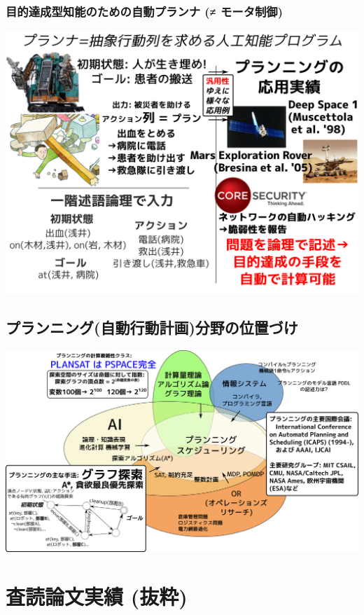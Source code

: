 \subsubsection{目的達成型知能のための自動プランナ (≠ モータ制御)}
\label{sec:orgheadline16}

\includegraphics{img/planning/final.png}

\subsection{プランニング(自動行動計画)分野の位置づけ}
\label{sec:orgheadline18}

\includegraphics{img/planning2.png}

\section{査読論文実績 (抜粋)}
\label{sec:orgheadline26}

